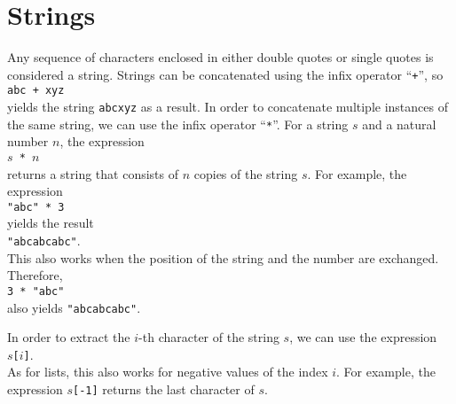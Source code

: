 \section{Strings}
Any sequence of characters enclosed in either double quotes or single quotes is considered a string.
Strings can be concatenated using the infix operator ``\texttt{+}'', so
\\[0.2cm]
\hspace*{1.3cm}
\texttt{abc + xyz}
\\[0.2cm]
yields the string \texttt{abcxyz} as a result.
In order to concatenate multiple instances of the same string, we can use the infix
operator ``\texttt{*}''.  For a string $s$ and a natural number $n$, the expression
\\[0.2cm]
\hspace*{1.3cm}
\texttt{$s$ * $n$}
\\[0.2cm]
returns a string that consists of $n$ copies of the string $s$.  For example, the
expression 
\\[0.2cm]
\hspace*{1.3cm}
\texttt{"abc" * 3}
\\[0.2cm]
yields the result
\\[0.2cm]
\hspace*{1.3cm}
\texttt{"abcabcabc"}.
\\[0.2cm]
This also works when the position of the string and the number are exchanged.  Therefore,
\\[0.2cm]
\hspace*{1.3cm}
\texttt{3 * "abc"}
\\[0.2cm]
also yields \texttt{"abcabcabc"}.


In order to extract the $i$-th character of the string $s$, we can use the expression
\\[0.2cm]
\hspace*{1.3cm}
\texttt{$s$[$i$]}.
\\[0.2cm]
As for lists, this also works for negative values of the index $i$.  For example, the expression \texttt{$s$[-1]}
returns the last character of $s$.

